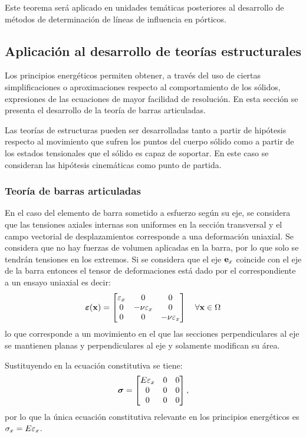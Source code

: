 Este teorema será aplicado en unidades temáticas posteriores al desarrollo de métodos de determinación de líneas de influencia en pórticos.

\subsection{Aplicación al desarrollo de teorías estructurales}

Los principios energéticos permiten obtener, a través del uso de ciertas simplificaciones o aproximaciones respecto al comportamiento de los sólidos, expresiones de las ecuaciones de mayor facilidad de resolución. %
%
En esta sección se presenta el desarrollo de la teoría de barras articuladas.


Las teorías de estructuras pueden ser desarrolladas tanto a partir de hipótesis respecto al movimiento que sufren los puntos del cuerpo sólido como a partir de los estados tensionales que el sólido es capaz de soportar. %
%
En este caso se consideran las hipótesis cinemáticas como punto de partida. %

\subsubsection{Teoría de barras articuladas}

%
En el caso del elemento de barra sometido a esfuerzo según su eje, se considera que las tensiones axiales internas son uniformes en la sección transversal y el campo vectorial de desplazamientos corresponde a una deformación uniaxial. %
%
Se considera que no hay fuerzas de volumen aplicadas en la barra, por lo que solo se tendrán tensiones en los extremos. %
%
Si se considera que el eje ${\bf e}_x$ coincide con el eje de la barra entonces el tensor de deformaciones está dado por el correspondiente a un ensayo uniaxial es decir:
%
\begin{equation} \label{eqn:epsbarras}
\boldsymbol{\varepsilon} ({\bf x}) = \left[
\begin{matrix}
\varepsilon_x & 0 & 0\\
0 & -\nu \varepsilon_x & 0\\
0 & 0 & -\nu \varepsilon_x
\end{matrix}\right]  \quad \forall {\bf x}\in\Omega
\end{equation}
%
lo que corresponde a un movimiento en el que las secciones perpendiculares al eje se mantienen planas y perpendiculares al eje y solamente modifican su área. %
%

Sustituyendo en la ecuación constitutiva se tiene:
%
\begin{equation} \label{eqn:sigmaBarra}
\boldsymbol{\sigma} = \left[
\begin{matrix}
	E\varepsilon_x & 0 & 0\\
	0 & 0 & 0\\
	0 & 0 & 0
\end{matrix}\right],
\end{equation}
%
por lo que la única ecuación constitutiva relevante en los principios energéticos es $\sigma_x = E \varepsilon_x$.

